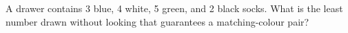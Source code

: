 A drawer contains 3 blue, 4 white, 5 green, and 2 black socks. What is the least number drawn without looking that guarantees a matching-colour pair?
